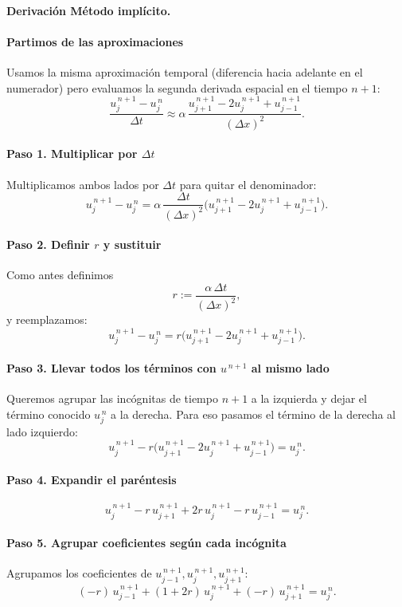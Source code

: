 \documentclass[12pt,a4paper]{article}
\begin{document}
\paragraph{Derivación Método implícito.}

\paragraph{Partimos de las aproximaciones}  
Usamos la misma aproximación temporal (diferencia hacia adelante en el numerador) pero evaluamos la segunda derivada espacial en el tiempo \(n+1\):
\[
\frac{u_j^{\,n+1}-u_j^{\,n}}{\Delta t}
\approx
\alpha\,\frac{u_{j+1}^{\,n+1}-2u_j^{\,n+1}+u_{j-1}^{\,n+1}}{(\Delta x)^2}.
\]

\paragraph{Paso 1. Multiplicar por \(\Delta t\)}  
Multiplicamos ambos lados por \(\Delta t\) para quitar el denominador:
\[
u_j^{\,n+1}-u_j^{\,n}
= \alpha\,\frac{\Delta t}{(\Delta x)^2}\big(u_{j+1}^{\,n+1}-2u_j^{\,n+1}+u_{j-1}^{\,n+1}\big).
\]

\paragraph{Paso 2. Definir \(r\) y sustituir}  
Como antes definimos
\[
r := \frac{\alpha\,\Delta t}{(\Delta x)^2},
\]
y reemplazamos:
\[
u_j^{\,n+1}-u_j^{\,n} = r\big(u_{j+1}^{\,n+1}-2u_j^{\,n+1}+u_{j-1}^{\,n+1}\big).
\]

\paragraph{Paso 3. Llevar todos los términos con \(u^{\,n+1}\) al mismo lado}  
Queremos agrupar las incógnitas de tiempo \(n+1\) a la izquierda y dejar el término conocido \(u_j^{\,n}\) a la derecha. Para eso pasamos el término de la derecha al lado izquierdo:
\[
u_j^{\,n+1} - r\big(u_{j+1}^{\,n+1}-2u_j^{\,n+1}+u_{j-1}^{\,n+1}\big) = u_j^{\,n}.
\]

\paragraph{Paso 4. Expandir el paréntesis}  
\[
u_j^{\,n+1} - r\,u_{j+1}^{\,n+1} + 2r\,u_j^{\,n+1} - r\,u_{j-1}^{\,n+1} = u_j^{\,n}.
\]

\paragraph{Paso 5. Agrupar coeficientes según cada incógnita}  
Agrupamos los coeficientes de \(u_{j-1}^{\,n+1}, u_j^{\,n+1}, u_{j+1}^{\,n+1}\):
\[
(-r)\,u_{j-1}^{\,n+1} + (1+2r)\,u_j^{\,n+1} + (-r)\,u_{j+1}^{\,n+1} = u_j^{\,n}.
\]
\end{document}
